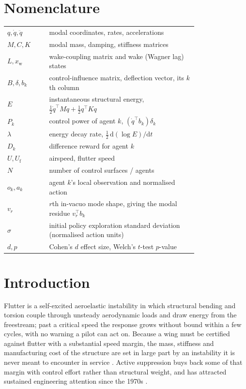 \documentclass[preprint,11pt]{elsarticle}
\newcommand{\Uf}{U_{\mathrm{f}}}
\begin{document}
\section*{Nomenclature}
\begin{tabular}{@{}lp{0.78\linewidth}@{}}
$q,\dot q,\ddot q$ & modal coordinates, rates, accelerations \\
$M,C,K$ & modal mass, damping, stiffness matrices \\
$L,x_{\mathrm{w}}$ & wake-coupling matrix and wake (Wagner lag) states \\
$B,\delta,b_k$ & control-influence matrix, deflection vector, its $k$th column \\
$E$ & instantaneous structural energy, $\tfrac12\dot q^\top M\dot q+\tfrac12 q^\top Kq$ \\
$P_k$ & control power of agent $k$, $(\dot q^\top b_k)\delta_k$ \\
$\lambda$ & energy decay rate, $\tfrac12\,\mathrm{d}(\log E)/\mathrm{d}t$ \\
$D_k$ & difference reward for agent $k$ \\
$U,\Uf$ & airspeed, flutter speed \\
$N$ & number of control surfaces / agents \\
$o_k,a_k$ & agent $k$'s local observation and normalised action \\
$v_r$ & $r$th in-vacuo mode shape, giving the modal residue $v_r^\top b_k$ \\
$\sigma$ & initial policy exploration standard deviation (normalised action units) \\
$d,p$ & Cohen's $d$ effect size, Welch's $t$-test $p$-value \\
\end{tabular}

\section{Introduction}
\label{sec:intro}

Flutter is a self-excited aeroelastic instability in which structural
bending and torsion couple through unsteady aerodynamic loads and draw
energy from the freestream; past a critical speed the response grows
without bound within a few cycles, with no warning a pilot can act on.
Because a wing must be certified against flutter with a substantial speed
margin, the mass, stiffness and manufacturing cost of the structure are set
in large part by an instability it is never meant to encounter in service
\cite{livne2018flutter, mukhopadhyay2003historical}. Active suppression buys
back some of that margin with control effort rather than structural weight,
and has attracted sustained engineering attention since the 1970s
\cite{karpel1982design,waszak2001robust,block1998applied}.
\end{document}
